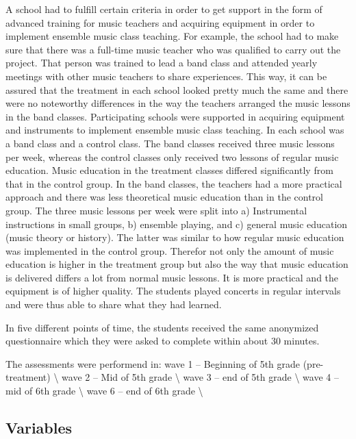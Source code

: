 \documentclass[a4, 12pt]{article}
\begin{document}
A school had to fulfill certain criteria in order to get support in the form of advanced training for music teachers and acquiring equipment in order to implement ensemble music class teaching. For example, the school had to make sure that there was a full-time music teacher who was qualified to carry out the project. That person was trained to lead a band class and attended yearly meetings with other music teachers to share experiences. This way, it can be assured that the treatment in each school looked pretty much the same and there were no noteworthy differences in the way the teachers arranged the music lessons in the band classes. Participating schools were supported in acquiring equipment and instruments to implement ensemble music class teaching. In each school was a band class and a control class. The band classes received three music lessons per week, whereas the control classes only received two lessons of regular music education. Music education in the treatment classes differed significantly from that in the control group. In the band classes, the teachers had a more practical approach and there was less theoretical music education than in the control group. The three music lessons per week were split into a) Instrumental instructions in small groups, b) ensemble playing, and c) general music education (music theory or history). The latter was similar to how regular music education was implemented in the control group. Therefor not only the amount of music education is higher in the treatment group but also the way that music education is delivered differs a lot from normal music lessons. It is more practical and the equipment is of higher quality. The students played concerts in regular intervals and were thus able to share what they had learned.

In five different points of time, the students received the same anonymized questionnaire which they were asked to complete within about 30 minutes.

The assessments were performend in:
wave 1 -- Beginning of 5th grade (pre-treatment) \textbackslash{}
wave 2 -- Mid of 5th grade \textbackslash{}
wave 3 -- end of 5th grade \textbackslash{}
wave 4 -- mid of 6th grade \textbackslash{}
wave 6 -- end of 6th grade \textbackslash{}

\hypertarget{variables}{%
\subsection{Variables}\label{variables}}
\end{document}
